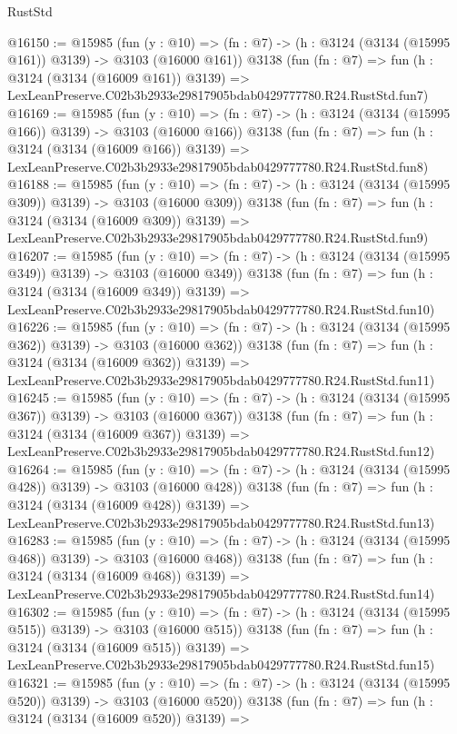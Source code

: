\begin{lexlean}{RustStd}
\begin{coremodule}
@16150 := @15985
    (fun (y : @10) => (fn : @7) -> (h : @3124 (@3134 (@15995 @161)) @3139) -> @3103 (@16000 @161))
    @3138
    (fun (fn : @7) =>
    fun (h : @3124 (@3134 (@16009 @161)) @3139) =>
    LexLeanPreserve.C02b3b2933e29817905bdab0429777780.R24.RustStd.fun7)
@16169 := @15985
    (fun (y : @10) => (fn : @7) -> (h : @3124 (@3134 (@15995 @166)) @3139) -> @3103 (@16000 @166))
    @3138
    (fun (fn : @7) =>
    fun (h : @3124 (@3134 (@16009 @166)) @3139) =>
    LexLeanPreserve.C02b3b2933e29817905bdab0429777780.R24.RustStd.fun8)
@16188 := @15985
    (fun (y : @10) => (fn : @7) -> (h : @3124 (@3134 (@15995 @309)) @3139) -> @3103 (@16000 @309))
    @3138
    (fun (fn : @7) =>
    fun (h : @3124 (@3134 (@16009 @309)) @3139) =>
    LexLeanPreserve.C02b3b2933e29817905bdab0429777780.R24.RustStd.fun9)
@16207 := @15985
    (fun (y : @10) => (fn : @7) -> (h : @3124 (@3134 (@15995 @349)) @3139) -> @3103 (@16000 @349))
    @3138
    (fun (fn : @7) =>
    fun (h : @3124 (@3134 (@16009 @349)) @3139) =>
    LexLeanPreserve.C02b3b2933e29817905bdab0429777780.R24.RustStd.fun10)
@16226 := @15985
    (fun (y : @10) => (fn : @7) -> (h : @3124 (@3134 (@15995 @362)) @3139) -> @3103 (@16000 @362))
    @3138
    (fun (fn : @7) =>
    fun (h : @3124 (@3134 (@16009 @362)) @3139) =>
    LexLeanPreserve.C02b3b2933e29817905bdab0429777780.R24.RustStd.fun11)
@16245 := @15985
    (fun (y : @10) => (fn : @7) -> (h : @3124 (@3134 (@15995 @367)) @3139) -> @3103 (@16000 @367))
    @3138
    (fun (fn : @7) =>
    fun (h : @3124 (@3134 (@16009 @367)) @3139) =>
    LexLeanPreserve.C02b3b2933e29817905bdab0429777780.R24.RustStd.fun12)
@16264 := @15985
    (fun (y : @10) => (fn : @7) -> (h : @3124 (@3134 (@15995 @428)) @3139) -> @3103 (@16000 @428))
    @3138
    (fun (fn : @7) =>
    fun (h : @3124 (@3134 (@16009 @428)) @3139) =>
    LexLeanPreserve.C02b3b2933e29817905bdab0429777780.R24.RustStd.fun13)
@16283 := @15985
    (fun (y : @10) => (fn : @7) -> (h : @3124 (@3134 (@15995 @468)) @3139) -> @3103 (@16000 @468))
    @3138
    (fun (fn : @7) =>
    fun (h : @3124 (@3134 (@16009 @468)) @3139) =>
    LexLeanPreserve.C02b3b2933e29817905bdab0429777780.R24.RustStd.fun14)
@16302 := @15985
    (fun (y : @10) => (fn : @7) -> (h : @3124 (@3134 (@15995 @515)) @3139) -> @3103 (@16000 @515))
    @3138
    (fun (fn : @7) =>
    fun (h : @3124 (@3134 (@16009 @515)) @3139) =>
    LexLeanPreserve.C02b3b2933e29817905bdab0429777780.R24.RustStd.fun15)
@16321 := @15985
    (fun (y : @10) => (fn : @7) -> (h : @3124 (@3134 (@15995 @520)) @3139) -> @3103 (@16000 @520))
    @3138
    (fun (fn : @7) =>
    fun (h : @3124 (@3134 (@16009 @520)) @3139) =>

\end{coremodule}
\end{lexlean}
